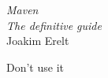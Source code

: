 \documentclass[12pt]{memoir}
\begin{document}
\pagestyle{empty}

{\let\cleardoublepage\clearpage
\begin{titlingpage}
\raggedleft
\vspace*{\baselineskip}
{\Huge\itshape Maven}\\[\baselineskip]
{\large\itshape The definitive guide}\\[0.2\textheight]
{\Large Joakim Erelt}\par
\end{titlingpage}
}


\begin{vplace}
{\Huge Don't use it}
\end{vplace}
\end{document}
